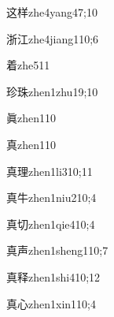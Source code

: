\begin{verbete}{这样}{zhe4yang4}{7;10}
\end{verbete}

\begin{verbete}{浙江}{zhe4jiang1}{10;6}
\end{verbete}

\begin{verbete}{着}{zhe5}{11}
\end{verbete}

\begin{verbete}{珍珠}{zhen1zhu1}{9;10}
\end{verbete}

\begin{verbete}{眞}{zhen1}{10}
\end{verbete}

\begin{verbete}{真}{zhen1}{10}
\end{verbete}

\begin{verbete}{真理}{zhen1li3}{10;11}
\end{verbete}

\begin{verbete}{真牛}{zhen1niu2}{10;4}
\end{verbete}

\begin{verbete}{真切}{zhen1qie4}{10;4}
\end{verbete}

\begin{verbete}{真声}{zhen1sheng1}{10;7}
\end{verbete}

\begin{verbete}{真释}{zhen1shi4}{10;12}
\end{verbete}

\begin{verbete}{真心}{zhen1xin1}{10;4}
\end{verbete}

